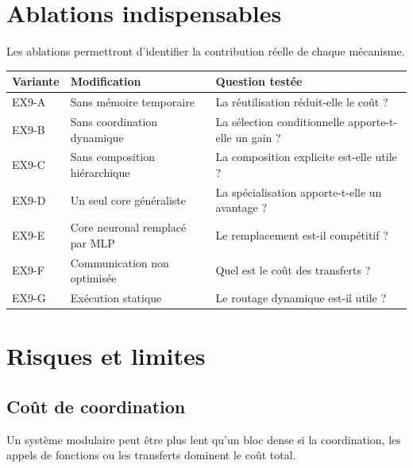 \documentclass[11pt,a4paper]{article}
\begin{document}
\section{Ablations indispensables}

Les ablations permettront d'identifier la contribution réelle de
chaque mécanisme.

\begin{longtable}{p{3.2cm}p{4.0cm}p{6.0cm}}
\toprule
Variante & Modification & Question testée \\
\midrule
EX9-A & Sans mémoire temporaire &
La réutilisation réduit-elle le coût ? \\

EX9-B & Sans coordination dynamique &
La sélection conditionnelle apporte-t-elle un gain ? \\

EX9-C & Sans composition hiérarchique &
La composition explicite est-elle utile ? \\

EX9-D & Un seul core généraliste &
La spécialisation apporte-t-elle un avantage ? \\

EX9-E & Core neuronal remplacé par MLP &
Le remplacement est-il compétitif ? \\

EX9-F & Communication non optimisée &
Quel est le coût des transferts ? \\

EX9-G & Exécution statique &
Le routage dynamique est-il utile ? \\
\bottomrule
\end{longtable}

\section{Risques et limites}

\subsection{Coût de coordination}

Un système modulaire peut être plus lent qu'un bloc dense si la
coordination, les appels de fonctions ou les transferts dominent
le coût total.
\end{document}
